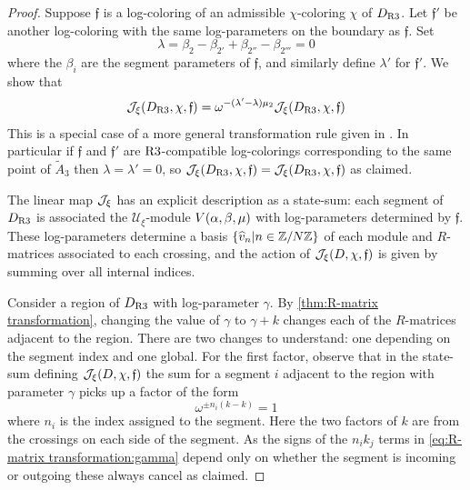 \documentclass{sl2ams}
\numberwithin{equation}{section}
\newcommand{\U}{\mathcal{U}}
\begin{document}
\begin{proof}
  Suppose \(\mathfrak{f}\) is a log-coloring of an admissible \(\chi\)-coloring \(\chi\) of \(D_{\operatorname{R3}}\).
  Let \(\mathfrak{f}'\) be another log-coloring with the same log-parameters on the boundary as \(\mathfrak{f}\).
  Set 
  \[
    \lambda
    =
    \beta_{2} - \beta_{2'} + \beta_{2''} - \beta_{2'''} = 0
  \]
  where the \(\beta_{i}\) are the segment parameters of \(\mathfrak{f}\), and similarly define \(\lambda'\) for \(\mathfrak{f}'\).
  We show that
  \begin{equation}
    \label{eq:jfunc-longitude-dep}
    \jfunc(D_{\RIII}, \chi, \mathfrak{f})
    =
    \omega^{- (\lambda' - \lambda)\mu_{2}}
    \jfunc(D_{\RIII}, \chi, \mathfrak{f})
  \end{equation}
  This is a special case of a more general transformation rule given in \cite{McPhailSnyderVolume}.
  In particular if \(\mathfrak{f}\) and \(\mathfrak{f}'\) are \(\operatorname{R3}\)-compatible log-colorings corresponding to the same point of \(\widetilde{A}_{3}\) then \(\lambda = \lambda' = 0\), so  \(
    \jfunc(D_{\RIII}, \chi, \mathfrak{f})
    =
    \jfunc(D_{\RIII}, \chi, \mathfrak{f})
  \) as claimed.

  The linear map \(\jfunc\) has an explicit description as a state-sum: each segment of \(D_{\operatorname{R3}}\) is associated the \(\U_\xi\)-module \(V\mathopen{}\left(\alpha, \beta, \mu\right)\) with log-parameters determined by \(\mathfrak{f}\).
  These log-parameters determine a basis \(\set{\vbh{n} | n \in \mathbb{Z}/\nr \mathbb{Z}}\) of each module and \(R\)-matrices associated to each crossing, and the action of \(\jfunc(D, \chi, \mathfrak{f})\) is given by summing over all internal indices.

  Consider a region of \(D_{\operatorname{R3}}\) with log-parameter \(\gamma\).
  By \cref{thm:R-matrix transformation}, changing the value of \(\gamma\) to \(\gamma + k\) changes each of the \(R\)-matrices adjacent to the region.
  There are two changes to understand: one depending on the segment index and one global.
  For the first factor, observe that in the state-sum defining \(\jfunc(D, \chi, \mathfrak{f})\) the sum for a segment \(i\) adjacent to the region with parameter \(\gamma\) picks up a factor of the form
  \[
    \omega^{ \pm n_i (k - k)} = 1
  \]
  where \(n_i\) is the index assigned to the segment.
  Here the two factors of \(k\) are from the crossings on each side of the segment.
  As the signs of the \(n_i k_j\) terms in \cref{eq:R-matrix transformation:gamma} depend only on whether the segment is incoming or outgoing these always cancel as claimed.



\end{proof}
\end{document}

